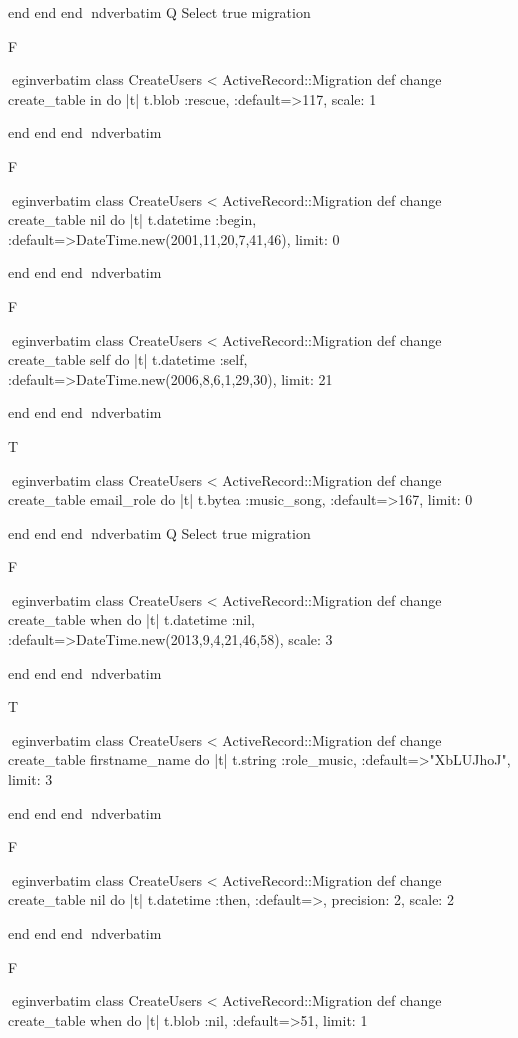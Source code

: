     end 
  end 
end
nd{verbatim}
Q
 Select true migration

F

egin{verbatim}
 class CreateUsers < ActiveRecord::Migration 
  def change 
    create_table in do |t| 
      t.blob :rescue, :default=>117, scale: 1
    
    end 
  end 
end
nd{verbatim}

F

egin{verbatim}
 class CreateUsers < ActiveRecord::Migration 
  def change 
    create_table nil do |t| 
      t.datetime :begin, :default=>DateTime.new(2001,11,20,7,41,46), limit: 0
    
    end 
  end 
end
nd{verbatim}

F

egin{verbatim}
 class CreateUsers < ActiveRecord::Migration 
  def change 
    create_table self do |t| 
      t.datetime :self, :default=>DateTime.new(2006,8,6,1,29,30), limit: 21
    
    end 
  end 
end
nd{verbatim}

T

egin{verbatim}
 class CreateUsers < ActiveRecord::Migration 
  def change 
    create_table email_role do |t| 
      t.bytea :music_song, :default=>167, limit: 0
    
    end 
  end 
end
nd{verbatim}
Q
 Select true migration

F

egin{verbatim}
 class CreateUsers < ActiveRecord::Migration 
  def change 
    create_table when do |t| 
      t.datetime :nil, :default=>DateTime.new(2013,9,4,21,46,58), scale: 3
    
    end 
  end 
end
nd{verbatim}

T

egin{verbatim}
 class CreateUsers < ActiveRecord::Migration 
  def change 
    create_table firstname_name do |t| 
      t.string :role_music, :default=>"XbLUJhoJ", limit: 3
    
    end 
  end 
end
nd{verbatim}

F

egin{verbatim}
 class CreateUsers < ActiveRecord::Migration 
  def change 
    create_table nil do |t| 
      t.datetime :then, :default=>, precision: 2, scale: 2
    
    end 
  end 
end
nd{verbatim}

F

egin{verbatim}
 class CreateUsers < ActiveRecord::Migration 
  def change 
    create_table when do |t| 
      t.blob :nil, :default=>51, limit: 1
    
